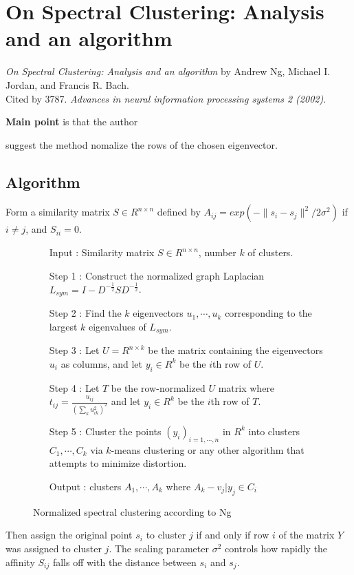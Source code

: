 \section{On Spectral Clustering: Analysis and an algorithm}
\label{ch:ng01}

\textit{On Spectral Clustering: Analysis and an algorithm} by Andrew Ng, Michael I. Jordan, and Francis R. Bach. \\
Cited by 3787. \textit{Advances in neural information processing systems 2 (2002)}.
\newline

\textbf{Main point} is that the author \begin{inparaenum}
\item suggest the method nomalize the rows of the chosen eigenvector.
\end{inparaenum}

\subsection{Algorithm}
Form a similarity matrix $S \in R^{n \times n}$ defined by $A_{ij} = exp(- \| s_i - s_j \|^2 / 2 \sigma^2)$ if $i \neq j$, and $S_{ii} = 0$.
\begin{figure}[ht]
\begin{mdframed}
\begin{enumerate}
\item[Input] : Similarity matrix $S \in R^{n \times n}$, number $k$ of clusters. \\
\item[Step 1] : Construct the normalized graph Laplacian $L_{sym} = I - D^{-\frac{1}{2}} S D^{-\frac{1}{2}}$. \\
\item[Step 2] : Find the $k$ eigenvectors $u_1, \cdots, u_k$ corresponding to the largest $k$ eigenvalues of $L_{sym}$. \\
\item[Step 3] : Let $U = R^{n \times k}$ be the matrix containing the eigenvectors $u_i$ as columns, and let $y_i \in R^k$ be the $i$th row of $U$.\\
\item[Step 4] : Let $T$ be the row-normalized $U$ matrix where $t_{ij} = \frac{u_{ij}}{(\sum_k u_{ik}^2)^2}$ and let $y_i \in R^k$ be the $i$th row of $T$.\\
\item[Step 5] : Cluster the points $(y_i)_{i=1,\cdots,n}$ in $R^k$ into clusters $C_1,\cdots,C_k$ via $k$-means clustering or any other algorithm that attempts to minimize distortion. \\
\item[Output] : clusters $A_1, \cdots, A_k$ where $A_k - {v_j|y_j \in C_i}$
\end{enumerate}
\end{mdframed}
\caption{Normalized spectral clustering according to Ng}
\end{figure}

Then assign the original point $s_i$ to cluster $j$ if and only if row $i$ of the matrix $Y$ was assigned to cluster $j$. The scaling parameter $\sigma^2$ controls how rapidly the affinity $S_{ij}$ falls off with the distance between $s_i$ and $s_j$.


